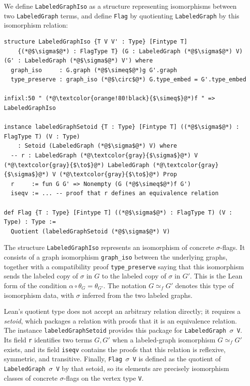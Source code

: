 \documentclass{article}
\newcommand{\lean}[1]{\texttt{#1}}
\begin{document}
We define \lean{LabeledGraphIso} as a structure representing isomorphisms
between two \lean{LabeledGraph} terms, and define \lean{Flag} by quotienting
\lean{LabeledGraph} by this isomorphism relation:
\begin{lstlisting}
structure LabeledGraphIso {T V V' : Type} [Fintype T]
    {(*@$\sigma$@*) : FlagType T} (G : LabeledGraph (*@$\sigma$@*) V) (G' : LabeledGraph (*@$\sigma$@*) V') where
  graph_iso     : G.graph (*@$\simeq$@*)g G'.graph
  type_preserve : graph_iso (*@$\circ$@*) G.type_embed = G'.type_embed

infixl:50 " (*@\textcolor{orange!80!black}{$\simeq$}@*)f " => LabeledGraphIso

instance labeledGraphSetoid {T : Type} [Fintype T] ((*@$\sigma$@*) : FlagType T) (V : Type)
    : Setoid (LabeledGraph (*@$\sigma$@*) V) where
  -- r : LabeledGraph (*@\textcolor{gray}{$\sigma$}@*) V (*@\textcolor{gray}{$\to$}@*) LabeledGraph (*@\textcolor{gray}{$\sigma$}@*) V (*@\textcolor{gray}{$\to$}@*) Prop
  r     := fun G G' => Nonempty (G (*@$\simeq$@*)f G')
  iseqv := ... -- proof that r defines an equivalence relation

def Flag {T : Type} [Fintype T] ((*@$\sigma$@*) : FlagType T) (V : Type) : Type :=
  Quotient (labeledGraphSetoid (*@$\sigma$@*) V)
\end{lstlisting}
The structure \lean{LabeledGraphIso} represents an isomorphism of concrete
$\sigma$-flags.
It consists of a graph isomorphism \lean{graph\_iso} between the underlying
graphs, together with a compatibility proof \lean{type\_preserve} saying that
this isomorphism sends the labeled copy of $\sigma$ in $G$ to the labeled copy
of $\sigma$ in $G'$.  This is the Lean form of the condition
$\alpha\circ\theta_G=\theta_{G'}$.  The notation $G\simeq_f G'$ denotes this
type of isomorphism data, with $\sigma$ inferred from the two labeled graphs.

Lean's quotient type does not accept an arbitrary relation directly; it
requires a \emph{setoid}, which packages a relation with proofs that it is an
equivalence relation.  The instance \lean{labeledGraphSetoid} provides this package for
\lean{LabeledGraph}~$\sigma$~\lean{V}.  Its field \lean{r} identifies two
terms $G,G'$ when a labeled-graph isomorphism $G\simeq_f G'$ exists, and its
field \lean{iseqv} contains the proofs that this relation is reflexive,
symmetric, and transitive.  Finally,
\lean{Flag}~$\sigma$~\lean{V} is defined as the quotient of
\lean{LabeledGraph}~$\sigma$~\lean{V} by that setoid, so its elements are
precisely isomorphism classes of concrete $\sigma$-flags on the vertex type
\lean{V}.
\end{document}
